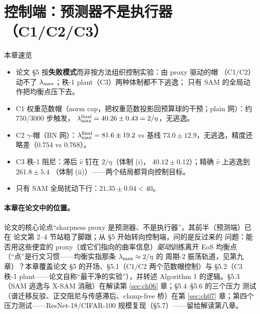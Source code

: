 
\section{控制端：预测器不是执行器（C1/C2/C3）}
\label{sec:ch05}

\begin{keybox}{本章速览}
\begin{itemize}
  \item 论文 §5 按\textbf{失败模式}而非按方法组织控制实验：由 proxy 驱动的帽
        （C1/C2）动不了 $\lambda_{\max}$；秩-1 plant（C3）两种体制都不下逃逸；
        只有 SAM 的全局动作把均衡点压下去。
  \item C1 权重范数帽（norm cap，把权重范数投影回预算球的干预；plain 网）：约 $750/3000$ 步触发，
        $\lambda_{\max}^{\mathrm{final}}=40.26\pm0.43=2/\eta$，无逃逸。
  \item C2 $\gamma$-帽（BN 网）：$\lambda_{\max}^{\mathrm{final}}=81.6\pm19.2$
        vs 基线 $73.0\pm12.9$，无逃逸，精度还略差（$0.754$ vs $0.768$）。
  \item C3 秩-1 阻尼：滞后 $\hat v$ 钉在 $2/\eta$（体制 (i)，
        $40.12\pm0.12$）；精确 $\hat v$ 上逃逸到 $261.8\pm5.4$
        （体制 (ii)）——两个结局都背向控制目标。
  \item 只有 SAM 全局扰动下行：$21.35\pm0.04<40$。
\end{itemize}
\end{keybox}

\paragraph{本章在论文中的位置。}
论文的核心论点``sharpness proxy 是预测器、不是执行器''，其前半（预测端）已在
论文第 2--4 节站稳了脚跟；从 §5 开始转向控制端，问的是反过来的
问题：能否用这些便宜的 proxy（或它们指向的曲率信息）\emph{驱动}训练离开 EoS
均衡点（``点''是行文习惯——均衡实指那条 $\lambda_{\max}\approx2/\eta$ 的
周期-2 振荡轨道，见第九章）？本章覆盖论文 §5 的开场、§5.1（C1/C2 两个范数帽控制）与 §5.2（C3
秩-1 plant——论文自称``最干净的实验''），并转述 Algorithm 1 的逻辑。§5.3
（SAM 逃逸与 X-SAM 消融）在解读第 \ref{sec:ch06} 章；§5.4--§5.6 的三个压力
测试（谱迁移反驳、正交阻尼与传感滞后、clamp-free 桥）在第 \ref{sec:ch07}
章；第四个压力测试——ResNet-18/CIFAR-100 规模复现（§5.7）——留给解读第八章。

